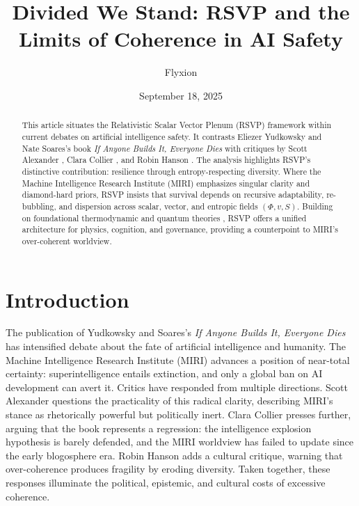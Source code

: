 \documentclass[12pt]{article}
\title{Divided We Stand: RSVP and the Limits of Coherence in AI Safety}
\author{Flyxion}
\date{September 18, 2025}
\begin{document}
\maketitle

\begin{abstract}
This article situates the Relativistic Scalar Vector Plenum (RSVP) framework within current debates on artificial intelligence safety. It contrasts Eliezer Yudkowsky and Nate Soares's book \textit{If Anyone Builds It, Everyone Dies} \citep{yudkowsky2025IABIED} with critiques by Scott Alexander \citep{alexander2025reviewIABIED}, Clara Collier \citep{collier2025reviewIABIED}, and Robin Hanson \citep{hanson2024culturaldrift}. The analysis highlights RSVP’s distinctive contribution: resilience through entropy-respecting diversity. Where the Machine Intelligence Research Institute (MIRI) emphasizes singular clarity and diamond-hard priors, RSVP insists that survival depends on recursive adaptability, re-bubbling, and dispersion across scalar, vector, and entropic fields $(\Phi,v,S)$. Building on foundational thermodynamic and quantum theories \citep{jacobson1995thermodynamics,verlinde2011entropic,barandes2022unistochastic}, RSVP offers a unified architecture for physics, cognition, and governance, providing a counterpoint to MIRI’s over-coherent worldview.
\end{abstract}

\tableofcontents

\section{Introduction}
The publication of Yudkowsky and Soares’s \textit{If Anyone Builds It, Everyone Dies} \citep{yudkowsky2025IABIED} has intensified debate about the fate of artificial intelligence and humanity. The Machine Intelligence Research Institute (MIRI) advances a position of near-total certainty: superintelligence entails extinction, and only a global ban on AI development can avert it. Critics have responded from multiple directions. Scott Alexander \citep{alexander2025reviewIABIED} questions the practicality of this radical clarity, describing MIRI’s stance as rhetorically powerful but politically inert. Clara Collier \citep{collier2025reviewIABIED} presses further, arguing that the book represents a regression: the intelligence explosion hypothesis is barely defended, and the MIRI worldview has failed to update since the early blogosphere era. Robin Hanson \citep{hanson2024culturaldrift} adds a cultural critique, warning that over-coherence produces fragility by eroding diversity. Taken together, these responses illuminate the political, epistemic, and cultural costs of excessive coherence.
\end{document}
